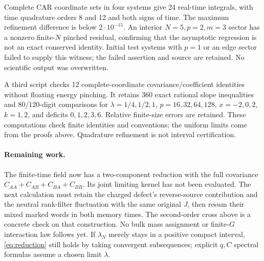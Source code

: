 \documentclass[11pt,a4paper]{article}
\begin{document}
Complete CAR coordinate sets in four systems give 24 real-time
integrals, with time quadrature orders 8 and 12 and both signs of
time. The maximum refinement difference is below $2\cdot10^{-15}$.
An interior $N=5,p=2,m=3$ sector has a nonzero finite-$N$ pinched
residual, confirming that the asymptotic regression is not an exact
conserved identity. Initial test systems with $p=1$ or an edge
sector failed to supply this witness; the failed assertion and
source are retained. No scientific output was overwritten.

A third script checks 12 complete-coordinate covariance/coefficient
identities without floating energy pinching. It retains 360 exact
rational slope inequalities and 80/120-digit comparisons for
$\lambda=1/4,1/2,1$, $p=16,32,64,128$, $x=-2,0,2$, $k=1,2$,
and deficits $0,1,2,3,6$. Relative finite-size errors are retained.
These computations check finite identities and conventions; the
uniform limits come from the proofs above. Quadrature refinement
is not interval certification.

\paragraph{Remaining work.}
The finite-time field now has a two-component reduction with the
full covariance $C_{AA}+C_{AB}+C_{BA}+C_{BB}$. Its joint limiting
kernel has not been evaluated. The next calculation must retain
the charged defect's reverse-source contribution and the neutral
rank-filter fluctuation with the same original $J$, then resum
their mixed marked words in both memory times. The second-order
cross above is a concrete check on that construction. No bulk
mass assignment or finite-$G$ interaction law follows yet.
If $\lambda_N$ merely stays in a positive compact interval,
\eqref{eq:reduction} still holds by taking convergent subsequences;
explicit $q,C$ spectral formulas assume a chosen limit $\lambda$.
\end{document}

